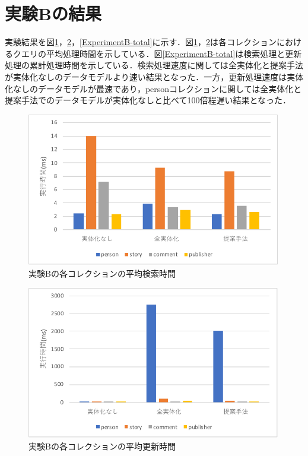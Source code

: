 \documentclass[a4paper,11pt]{ujreport}
\begin{document}
\section{実験Bの結果}
実験結果を図\ref{ExperimentB-find}，\ref{ExperimentB-update}，\ref{ExperimentB-total}に示す．図\ref{ExperimentB-find}，\ref{ExperimentB-update}は各コレクションにおけるクエリの平均処理時間を示している．図\ref{ExperimentB-total}は検索処理と更新処理の累計処理時間を示している．検索処理速度に関しては全実体化と提案手法が実体化なしのデータモデルより速い結果となった．一方，更新処理速度は実体化なしのデータモデルが最速であり，personコレクションに関しては全実体化と提案手法でのデータモデルが実体化なしと比べて100倍程遅い結果となった．
\begin{figure}[htbp]
	\begin{center}
		\includegraphics[width=30em]{src/ExperimentB-find.pdf} %
	\end{center}
	\caption{実験Bの各コレクションの平均検索時間}
	\label{ExperimentB-find}
\end{figure}
\begin{figure}[htbp]
	\begin{center}
		\includegraphics[width=30em]{src/ExperimentB-update.pdf} %
	\end{center}
	\caption{実験Bの各コレクションの平均更新時間}
	\label{ExperimentB-update}
\end{figure}
\end{document}
